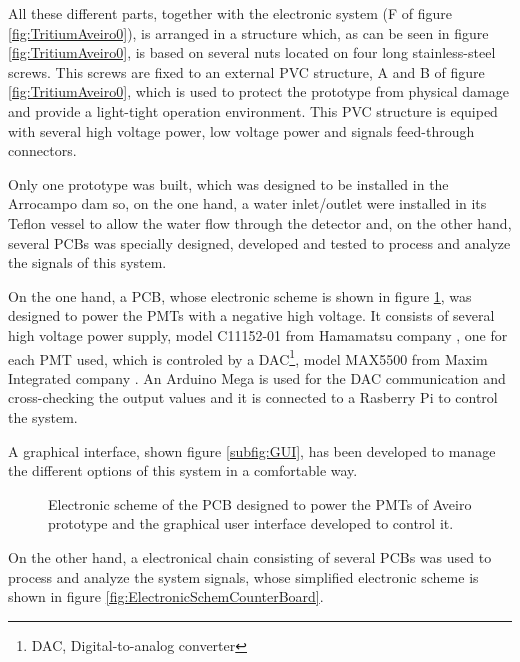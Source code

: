 All these different parts, together with the electronic system (F of figure \ref{fig:TritiumAveiro0}), is arranged in a structure which, as can be seen in figure \ref{fig:TritiumAveiro0}, is based on several nuts located on four long stainless-steel screws. This screws are fixed to an external PVC structure, A and B of figure \ref{fig:TritiumAveiro0}, which is used to protect the prototype from physical damage and provide a light-tight operation environment. This PVC structure is equiped with several high voltage power, low voltage power and signals feed-through connectors.

Only one prototype was built, which was designed to be installed in the Arrocampo dam so, on the one hand, a water inlet/outlet were installed in its Teflon vessel to allow the water flow through the detector and, on the other hand, several PCBs was specially designed, developed and tested to process and analyze the signals of this system.

On the one hand, a PCB, whose electronic scheme is shown in figure \ref{fig:HVElectronicAveiro}, was designed to power the PMTs with a negative high voltage. It consists of several high voltage power supply, model C11152-01 from Hamamatsu company \cite{PowerSupplyAveiroDataSheet}, one for each PMT used, which is controled by a DAC\footnote{DAC, Digital-to-analog converter}, model MAX5500 from Maxim Integrated company \cite{MAX5500DataSheet}. An Arduino Mega is used for the DAC communication and cross-checking the output values and it is connected to a Rasberry Pi to control the system.

A graphical interface, shown figure \ref{subfig:GUI}, has been developed to manage the different options of this system in a comfortable way.

\begin{figure}[h]
 \centering
 \caption{Electronic scheme of the PCB designed to power the PMTs of Aveiro prototype and the graphical user interface developed to control it.}
 \label{fig:HVElectronicAveiro}
\end{figure}

On the other hand, a electronical chain consisting of several PCBs was used to process and analyze the system signals, whose simplified electronic scheme is shown in figure \ref{fig:ElectronicSchemCounterBoard}.

